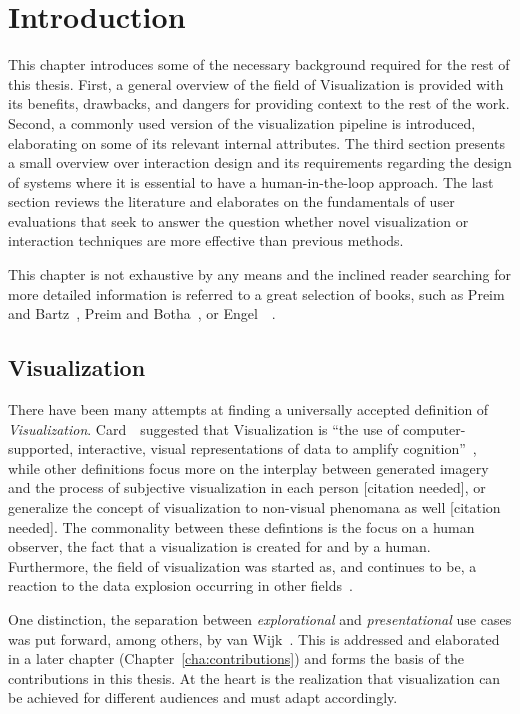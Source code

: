 \chapter{Introduction} \label{cha:intro}
This chapter introduces some of the necessary background required for the rest of this thesis.  First, a general overview of the field of Visualization is provided with its benefits, drawbacks, and dangers for providing context to the rest of the work.  Second, a commonly used version of the visualization pipeline is introduced, elaborating on some of its relevant internal attributes.  The third section presents a small overview over interaction design and its requirements regarding the design of systems where it is essential to have a human-in-the-loop approach.  The last section reviews the literature and elaborates on the fundamentals of user evaluations that seek to answer the question whether novel visualization or interaction techniques are more effective than previous methods.

This chapter is not exhaustive by any means and the inclined reader searching for more detailed information is referred to a great selection of books, such as Preim and Bartz~\cite{preim2007visualization}, Preim and Botha~\cite{preim2013visual}, or Engel~\etal~\cite{engel2006real}.

\section{Visualization} \label{cha:intro:vis}
There have been many attempts at finding a universally accepted definition of \emph{Visualization}.  Card~\etal~suggested that Visualization is ``the use of computer-supported, interactive, visual representations of data to amplify cognition''~\cite{card1999readings}, while other definitions focus more on the interplay between generated imagery and the process of subjective visualization in each person [citation needed], or generalize the concept of visualization to non-visual phenomana as well [citation needed].  The commonality between these defintions is the focus on a human observer, the fact that a visualization is created for and by a human.  Furthermore, the field of visualization was started as, and continues to be, a reaction to the data explosion occurring in other fields~\cite{lorensen2004death}.

One distinction, the separation between \emph{explorational} and \emph{presentational} use cases was put forward, among others, by van Wijk~\cite{van2005value}.  This is addressed and elaborated in a later chapter (Chapter~\ref{cha:contributions}) and forms the basis of the contributions in this thesis.  At the heart is the realization that visualization can be achieved for different audiences and must adapt accordingly.

